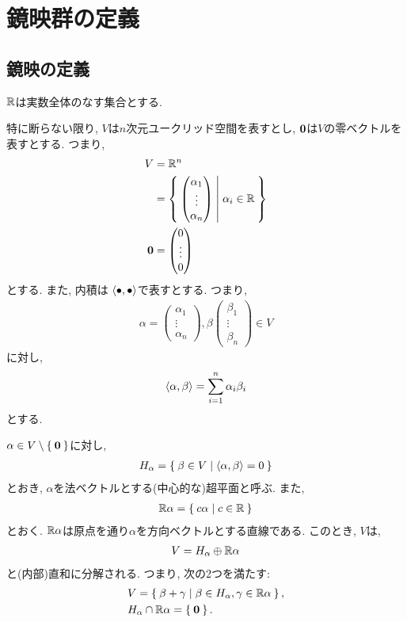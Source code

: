 \chapter{鏡映群の定義}
\section{鏡映の定義}
$\mathbb{R}$は実数全体のなす集合とする.

特に断らない限り,
$V$は$n$次元ユークリッド空間を表すとし,
$\boldsymbol{0}$は$V$の零ベクトルを表すとする.
つまり,
\begin{align*}
  V&=\mathbb{R}^n\\
  &=\Set{\begin{pmatrix}\alpha_1\\\vdots\\\alpha_n\end{pmatrix} | \alpha_i \in \mathbb{R}}\\
 \boldsymbol{0}&=\begin{pmatrix}0\\\vdots\\0\end{pmatrix}
\end{align*}
とする. また, 内積は $\Braket{\bullet,\bullet}$で表すとする.
つまり,
\begin{align*}
\alpha=\begin{pmatrix}\alpha_1\\\vdots\\\alpha_n\end{pmatrix},\beta\begin{pmatrix}\beta_1\\\vdots\\\beta_n\end{pmatrix}\in V
\end{align*}
に対し,
\begin{align*}
\Braket{\alpha,\beta}=\sum_{i=1}^n \alpha_i \beta_i
\end{align*}
とする.

$\alpha \in V\setminus\Set{\boldsymbol{0}}$に対し,
\begin{align*}
  H_\alpha = \Set{\beta \in V | \Braket{\alpha,\beta}=0}
\end{align*}
とおき, $\alpha$を法ベクトルとする(中心的な)超平面と呼ぶ.
また,
\begin{align*}
  \mathbb{R}\alpha = \Set{c \alpha | c\in \mathbb{R}}
\end{align*}
とおく. $\mathbb{R}\alpha$は原点を通り$\alpha$を方向ベクトルとする直線である.
このとき, $V$は,
\begin{align*}
  V =   H_\alpha \oplus   \mathbb{R}\alpha
\end{align*}
と(内部)直和に分解される.  つまり, 次の2つを満たす:
\begin{align*}
  &V = \Set{ \beta + \gamma | \beta \in H_\alpha, \gamma \in \mathbb{R}\alpha},\\
  &H_\alpha \cap   \mathbb{R}\alpha =\Set{\boldsymbol{0}}.
\end{align*}

